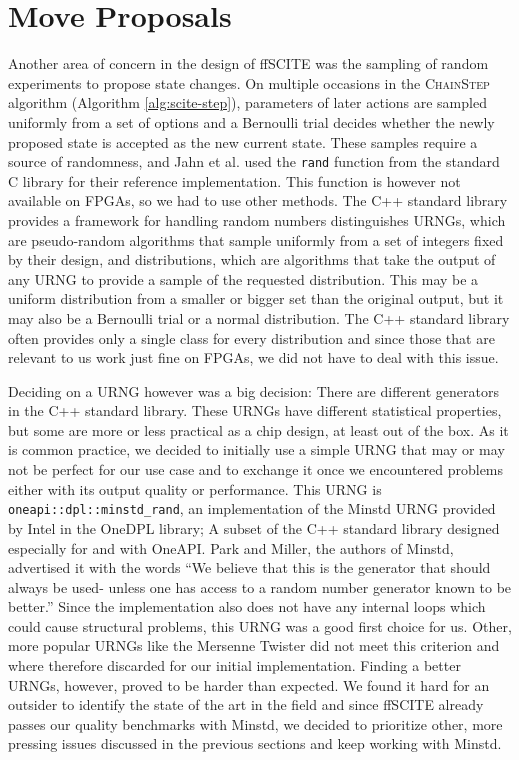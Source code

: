 \section{Move Proposals}
\label{sec:move_proposal}

Another area of concern in the design of \ac{ffSCITE} was the sampling of random experiments to propose state changes. On multiple occasions in the \textsc{ChainStep} algorithm (Algorithm \ref{alg:scite-step}), parameters of later actions are sampled uniformly from a set of options and a Bernoulli trial decides whether the newly proposed state is accepted as the new current state. These samples require a source of randomness, and Jahn et al. \cite{tree2016} used the \texttt{rand} function from the standard C library for their reference implementation. This function is however not available on \acp{FPGA}, so we had to use other methods. The C++ standard library provides a framework for handling random numbers distinguishes \acp{URNG}, which are pseudo-random algorithms that sample uniformly from a set of integers fixed by their design, and distributions, which are algorithms that take the output of any \ac{URNG} to provide a sample of the requested distribution. This may be a uniform distribution from a smaller or bigger set than the original output, but it may also be a Bernoulli trial or a normal distribution. The C++ standard library often provides only a single class for every distribution and since those that are relevant to us work just fine on \acp{FPGA}, we did not have to deal with this issue.

Deciding on a \ac{URNG} however was a big decision: There are different generators in the C++ standard library. These \acp{URNG} have different statistical properties, but some are more or less practical as a chip design, at least out of the box. As it is common practice, we decided to initially use a simple \ac{URNG} that may or may not be perfect for our use case and to exchange it once we encountered problems either with its output quality or performance. This \ac{URNG} is \texttt{oneapi::dpl::minstd\_rand}, an implementation of the Minstd \ac{URNG} \cite{park1988random} provided by Intel in the OneDPL library; A subset of the C++ standard library designed especially for and with OneAPI. Park and Miller, the authors of Minstd, advertised it with the words ``We believe that this is the generator that should always be used- unless one has access to a random number generator known to be better.'' \cite{park1988random} Since the implementation also does not have any internal loops which could cause structural problems, this \ac{URNG} was a good first choice for us. Other, more popular \acp{URNG} like the Mersenne Twister \cite{matsumoto1998mersenne} did not meet this criterion and where therefore discarded for our initial implementation. Finding a better \acp{URNG}, however, proved to be harder than expected. We found it hard for an outsider to identify the state of the art in the field and since \ac{ffSCITE} already passes our quality benchmarks with Minstd, we decided to prioritize other, more pressing issues discussed in the previous sections and keep working with Minstd.

